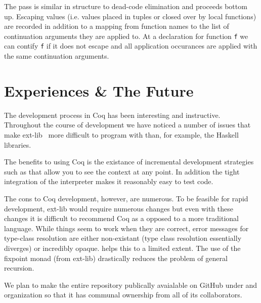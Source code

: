 \documentclass{article}
\begin{document}
The pass is similar in structure to dead-code elimination and proceeds bottom up. Escaping values (i.e. values placed in tuples or closed over by local functions) are recorded in addition to a mapping from function names to the list of continuation arguments they are applied to. At a declaration for function \lstinline!f! we can contify \lstinline!f! if it does not escape and all application occurances are applied with the same continuation arguments. 

\section*{Experiences \& The Future}
The development process in Coq has been interesting and instructive. Throughout the course of development we have noticed a number of issues that make ext-lib~\cite{coq-ext-lib} more difficult to program with than, for example, the Haskell libraries. 

The benefits to using Coq is the existance of incremental development strategies such as  that allow you to see the context at any point. In addition the tight integration of the interpreter makes it reasonably easy to test code.

The cons to Coq development, however, are numerous. To be feasible for rapid development, ext-lib would require numerous changes but even with these changes it is difficult to recommend Coq as a opposed to a more traditional language. While things seem to work when they are correct, error messages for type-class resolution are either non-existant (type class resolution essentially diverges) or incredibly opaque.  helps this to a limited extent. The use of the fixpoint monad (from ext-lib) drastically reduces the problem of general recursion.


We plan to make the entire repository publically avaialable on GitHub under and organization so that it has communal ownership from all of its collaborators.



\end{document}

